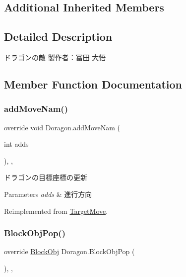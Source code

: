 \subsection*{Additional Inherited Members}


\subsection{Detailed Description}
ドラゴンの敵 製作者：冨田 大悟 



\subsection{Member Function Documentation}
\mbox{\label{class_doragon_a598414769bbb8243a523b937eba7225e}} 
\subsubsection{\texorpdfstring{add\+Move\+Nam()}{addMoveNam()}}
{\footnotesize\ttfamily override void Doragon.\+add\+Move\+Nam (\begin{DoxyParamCaption}\item[{int}]{adds }\end{DoxyParamCaption})\hspace{0.3cm}{\ttfamily [inline]}, {\ttfamily [protected]}, {\ttfamily [virtual]}}



ドラゴンの目標座標の更新 


\begin{DoxyParams}{Parameters}
{\em adds} & 進行方向\\
\hline
\end{DoxyParams}


Reimplemented from \hyperlink{class_target_move_ace85a95cffab1a4ce3f782c9be95248c}{Target\+Move}.

\mbox{\label{class_doragon_a981089224fd04b5d556eae0b9801112f}} 
\subsubsection{\texorpdfstring{Block\+Obj\+Pop()}{BlockObjPop()}}
{\footnotesize\ttfamily override \hyperlink{class_block_obj}{Block\+Obj} Doragon.\+Block\+Obj\+Pop (\begin{DoxyParamCaption}{ }\end{DoxyParamCaption})\hspace{0.3cm}{\ttfamily [inline]}, {\ttfamily [protected]}, {\ttfamily [virtual]}}




